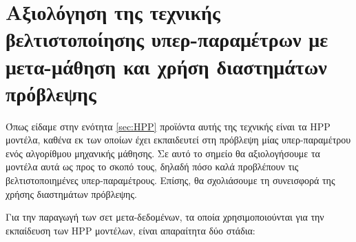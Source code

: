\section{Αξιολόγηση της τεχνικής βελτιστοποίησης υπερ-παραμέτρων με μετα-μάθηση και χρήση διαστημάτων πρόβλεψης}\label{section:hppexp}
Όπως είδαμε στην ενότητα \ref{sec:HPP} προϊόντα αυτής της τεχνικής είναι τα \gls{HPP} μοντέλα, καθένα εκ των οποίων έχει εκπαιδευτεί στη πρόβλεψη μίας υπερ-παραμέτρου ενός αλγορίθμου μηχανικής μάθησης. Σε αυτό το σημείο θα αξιολογήσουμε τα μοντέλα αυτά ως προς το σκοπό τους, δηλαδή πόσο καλά προβλέπουν τις βελτιστοποιημένες υπερ-παραμέτρους. Επίσης, θα σχολιάσουμε τη συνεισφορά της χρήσης διαστημάτων πρόβλεψης.

Για την παραγωγή των σετ μετα-δεδομένων, τα οποία χρησιμοποιούνται για την εκπαίδευση των HPP μοντέλων, είναι απαραίτητα δύο στάδια:
